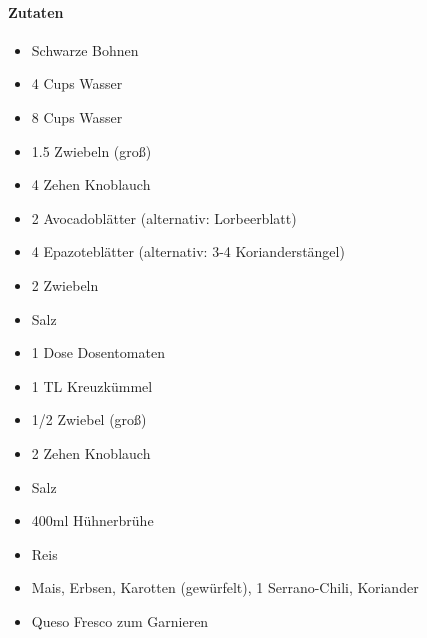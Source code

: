 \clearpage
{}
\label{RiceAndBeans}
\paragraph{Zutaten}
\begin{itemize}[noitemsep]
	\item Schwarze Bohnen
	\item 4 Cups Wasser
	\item 8 Cups Wasser
	\item 1.5 Zwiebeln (groß)
	\item 4 Zehen Knoblauch
	\item 2 Avocadoblätter (alternativ: Lorbeerblatt)
	\item 4 Epazoteblätter (alternativ: 3-4 Korianderstängel)
	\item 2 Zwiebeln
	\item Salz
	\vspace{0.5cm}
	\item 1 Dose Dosentomaten
	\item 1 TL Kreuzkümmel
	\item 1/2 Zwiebel (groß)
	\item 2 Zehen Knoblauch
	\item Salz
	\item 400ml Hühnerbrühe
	\vspace{0.5cm}
	\item Reis
	\item Mais, Erbsen, Karotten (gewürfelt), 1 Serrano-Chili, Koriander
	\item Queso Fresco zum Garnieren
\end{itemize}


